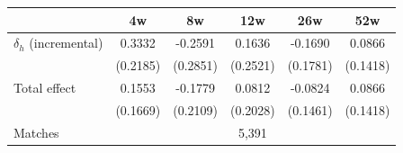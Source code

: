 \begin{tabular}{l*{5}{c}}
\toprule
 & 4w & 8w & 12w & 26w & 52w \\
\midrule
$\delta_h$ (incremental) & 0.3332 & -0.2591 & 0.1636 & -0.1690 & 0.0866 \\
 & (0.2185) & (0.2851) & (0.2521) & (0.1781) & (0.1418) \\[0.3em]
Total effect & 0.1553 & -0.1779 & 0.0812 & -0.0824 & 0.0866 \\
 & (0.1669) & (0.2109) & (0.2028) & (0.1461) & (0.1418) \\
\midrule
Matches & \multicolumn{5}{c}{5,391} \\
\bottomrule
\end{tabular}
